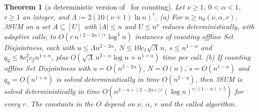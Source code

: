 \documentclass[11pt]{article}
\newtheorem{theorem}{Theorem}[section]
\theoremstyle{definition}
\theoremstyle{remark}
\begin{document}
\begin{theorem}[a deterministic version of~\cite{KPP16} for counting]\label{s:thm:kpp}
Let $\nu\ge1$, $0<\alpha<1$, $r\ge1$ an integer, and $\Lambda:=2(10(\nu+1)\ln n)^r$. \textup{(a)} For $n\ge n_0(\nu,\alpha,r)$, 3SUM on a set $A\subseteq[U]$ with $|A|\le n$ and $U\le n^\nu$ reduces deterministically, with adaptive calls, to $O(r\,n^{(2-2\alpha)/r}\log^4n)$ instances of counting offline Set Disjointness, each with $u\le\Lambda n^{2-2\alpha}$, $N\le10c_1\sqrt\Lambda\,n$, $s\le n^{1-\alpha}$ and $q_{\mathrm S}\le8c_1^2c_2n^{1+\alpha}$, plus $O(\sqrt\Lambda\,n^{2-\alpha}\log n+n^{1+\alpha})$ time per call. \textup{(b)} If counting offline Set Disjointness with $u=O(n^{2-2\alpha})$, $N=O(n)$, $s=O(n^{1-\alpha})$ and $q_{\mathrm S}=O(n^{1+\alpha})$ is solved deterministically in time $O(n^{2-\eta})$, then 3SUM is solved deterministically in time $O(n^{2-\eta+(2-2\alpha)/r}(\log n)^{r/(1-\alpha)+5})$ for every $r$. The constants in the $O$ depend on $\nu$, $\alpha$, $r$ and the called algorithm.
\end{theorem}
\end{document}
